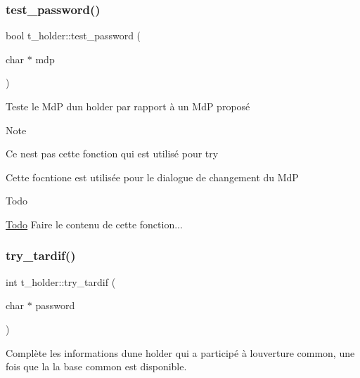 \subsubsection{\texorpdfstring{test\+\_\+password()}{test\_password()}}
{\footnotesize\ttfamily bool t\+\_\+holder\+::test\+\_\+password (\begin{DoxyParamCaption}\item[{char $\ast$}]{mdp }\end{DoxyParamCaption})}



Teste le MdP d\textquotesingle{}un holder par rapport à un MdP proposé 

\begin{DoxyNote}{Note}

\begin{DoxyItemize}
\item Ce n\textquotesingle{}est pas cette fonction qui est utilisé pour \textquotesingle{}try\textquotesingle{}
\item Cette focntione est utilisée pour le dialogue de changement du MdP 
\end{DoxyItemize}
\end{DoxyNote}
\begin{DoxyRefDesc}{Todo}
\item[\hyperlink{todo__todo000009}{Todo}]Faire le contenu de cette fonction... \end{DoxyRefDesc}
\mbox{\label{classt__holder_a350849be70b8ed9acd165ec1cf9e4e96}} 
\subsubsection{\texorpdfstring{try\+\_\+tardif()}{try\_tardif()}}
{\footnotesize\ttfamily int t\+\_\+holder\+::try\+\_\+tardif (\begin{DoxyParamCaption}\item[{char $\ast$}]{password }\end{DoxyParamCaption})}



Complète les informations d\textquotesingle{}une holder qui a participé à l\textquotesingle{}ouverture common, une fois que la la base common est disponible. 


